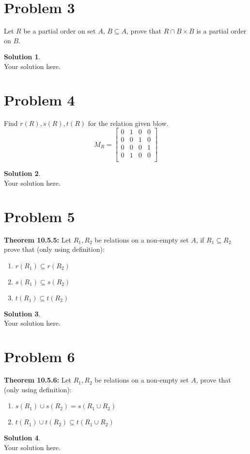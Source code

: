 \documentclass[a4paper,UTF8]{article}
\theoremstyle{definition}
\newtheorem*{solution}{Solution}
\begin{document}
\section*{Problem 3}
Let $R$ be a partial order on set $A$, $B\subseteq A$, prove that $R\cap B\times B$ is a partial order on $B$.
\begin{solution}
	~\\
	Your solution here.
\end{solution}

\section*{Problem 4}
Find $r(R),s(R),t(R)$ for the relation given blow.
$$M_R=\left[\begin{array}{cccc} 
0 & 1 & 0 & 0 \\ 
0 & 0 & 1 & 0 \\ 
0 & 0 & 0 & 1 \\
0 & 1 & 0 & 0 \\
\end{array}\right]
$$
\begin{solution}
	~\\
	Your solution here.
\end{solution}

\section*{Problem 5}
\textbf{Theorem 10.5.5: }Let $R_1,R_2$ be relations on a non-empty set $A$, if $R_1\subseteq R_2$ prove that (only using definition):
\begin{enumerate}
	\item $r(R_1)\subseteq r(R_2)$
	\item $s(R_1)\subseteq s(R_2)$
	\item $t(R_1)\subseteq t(R_2)$
\end{enumerate}
\begin{solution}
	~\\
	Your solution here.
\end{solution}


\section*{Problem 6}
\textbf{Theorem 10.5.6: }Let $R_1,R_2$ be relations on a non-empty set $A$,  prove that (only using definition):
\begin{enumerate}
	\item $s(R_1) \cup s(R_2)= s(R_1\cup R_2)$
	\item $t(R_1) \cup t(R_2)\subseteq t(R_1\cup R_2)$
\end{enumerate}
\begin{solution}
	~\\
	Your solution here.
\end{solution}
\end{document}
